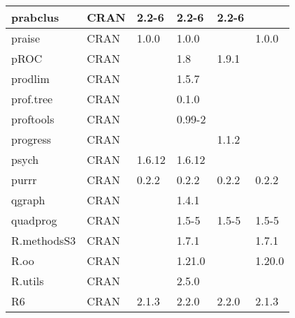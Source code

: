 \begin{longtable}{|llllll|}
prabclus                      & CRAN                      & 2.2-6       & 2.2-6       & 2.2-6          &                  \\ \hline
praise                        & CRAN                      & 1.0.0       & 1.0.0       &                & 1.0.0             \\ \hline \rowcolor{gray!25}
pROC                          & CRAN                      &             & 1.8         & 1.9.1          &                  \\ \hline
prodlim                       & CRAN                      &             & 1.5.7       &                &                   \\ \hline \rowcolor{gray!25}
prof.tree                     & CRAN                      &             & 0.1.0       &                &                  \\ \hline
proftools                     & CRAN                      &             & 0.99-2      &                &                   \\ \hline \rowcolor{gray!25}
progress                      & CRAN                      &             &             & 1.1.2          &                  \\ \hline
psych                         & CRAN                      & 1.6.12      & 1.6.12      &                &                   \\ \hline \rowcolor{gray!25}
purrr                         & CRAN                      & 0.2.2       & 0.2.2       & 0.2.2          & 0.2.2            \\ \hline
qgraph                        & CRAN                      &             & 1.4.1       &                &                   \\ \hline \rowcolor{gray!25}
quadprog                      & CRAN                      &             & 1.5-5       & 1.5-5          & 1.5-5            \\ \hline
R.methodsS3                   & CRAN                      &             & 1.7.1       &                & 1.7.1             \\ \hline \rowcolor{gray!25}
R.oo                          & CRAN                      &             & 1.21.0      &                & 1.20.0           \\ \hline
R.utils                       & CRAN                      &             & 2.5.0       &                &                   \\ \hline \rowcolor{gray!25}
R6                            & CRAN                      & 2.1.3       & 2.2.0       & 2.2.0          & 2.1.3            \\ \hline

\end{longtable}
